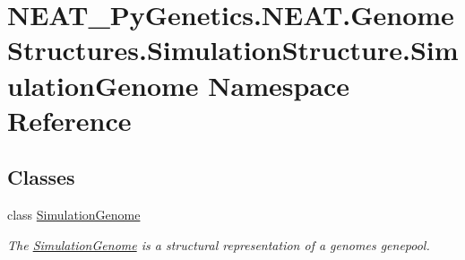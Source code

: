 \hypertarget{namespaceNEAT__PyGenetics_1_1NEAT_1_1GenomeStructures_1_1SimulationStructure_1_1SimulationGenome}{}\section{N\+E\+A\+T\+\_\+\+Py\+Genetics.\+N\+E\+A\+T.\+Genome\+Structures.\+Simulation\+Structure.\+Simulation\+Genome Namespace Reference}
\label{namespaceNEAT__PyGenetics_1_1NEAT_1_1GenomeStructures_1_1SimulationStructure_1_1SimulationGenome}
\subsection*{Classes}
\begin{DoxyCompactItemize}
\item 
class \hyperlink{classNEAT__PyGenetics_1_1NEAT_1_1GenomeStructures_1_1SimulationStructure_1_1SimulationGenome_1_1SimulationGenome}{Simulation\+Genome}
\begin{DoxyCompactList}\small\item\em The \hyperlink{classNEAT__PyGenetics_1_1NEAT_1_1GenomeStructures_1_1SimulationStructure_1_1SimulationGenome_1_1SimulationGenome}{Simulation\+Genome} is a structural representation of a genome\textquotesingle{}s genepool. \end{DoxyCompactList}\end{DoxyCompactItemize}
